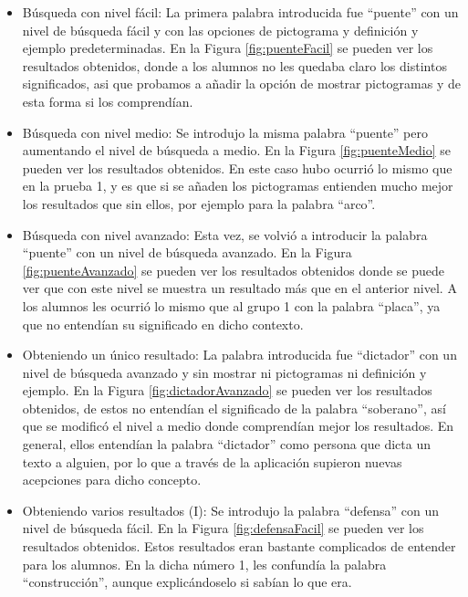 \begin{itemize}
	\item  Búsqueda con nivel fácil: La primera palabra introducida fue ``puente'' con un nivel de búsqueda fácil y con las opciones de pictograma y definición y ejemplo predeterminadas. En la Figura \ref{fig:puenteFacil} se pueden ver los resultados obtenidos, donde a los alumnos no les quedaba claro los distintos significados, asi que probamos a añadir la opción de mostrar pictogramas y de esta forma si los comprendían.
	
	\item Búsqueda con nivel medio: Se introdujo la misma palabra ``puente'' pero aumentando el nivel de búsqueda a medio. En la Figura \ref{fig:puenteMedio} se pueden ver los resultados obtenidos. En este caso hubo ocurrió lo mismo que en la prueba 1, y es que si se añaden los pictogramas entienden mucho mejor los resultados que sin ellos, por ejemplo para la palabra ``arco''.
	
	\item  Búsqueda con nivel avanzado: Esta vez, se volvió a introducir la palabra ``puente'' con un nivel de búsqueda avanzado. En la Figura  \ref{fig:puenteAvanzado} se pueden ver los resultados obtenidos donde se puede ver que con este nivel se muestra un resultado más que en el anterior nivel. A los alumnos les ocurrió lo mismo que al grupo 1 con la palabra ``placa'', ya que no entendían su significado en dicho contexto.
	
	\item  Obteniendo un único resultado: La palabra introducida fue ``dictador'' con un nivel de búsqueda avanzado y sin mostrar ni pictogramas ni definición y ejemplo. En la Figura \ref{fig:dictadorAvanzado} se pueden ver los resultados obtenidos, de estos no entendían el significado de la palabra ``soberano'', así que se modificó el nivel a medio donde comprendían mejor los resultados. En general, ellos entendían la palabra ``dictador'' como persona que dicta un texto a alguien, por lo que a través de la aplicación supieron nuevas acepciones para dicho  concepto.
	
	\item  Obteniendo varios resultados (I):  Se introdujo la palabra ``defensa'' con un nivel de búsqueda fácil. En la Figura \ref{fig:defensaFacil} se pueden ver los resultados obtenidos. Estos resultados eran bastante complicados de entender para los alumnos. En la dicha número 1, les confundía la palabra ``construcción'', aunque explicándoselo si sabían lo que era.
	

\end{itemize}
